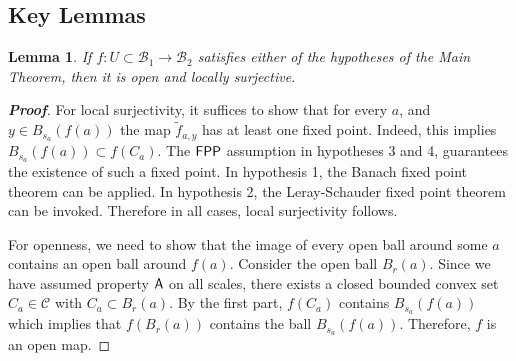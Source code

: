 \documentclass[a4, 12pt,leqno]{amsart}
\theoremstyle{plain}
\newtheorem{lemma}{Lemma}[section]
\theoremstyle{definition}
\theoremstyle{remark}
\numberwithin{equation}{section}
\newcommand{\B}{\mathcal{B}}
\begin{document}
\subsection{Key Lemmas}
\begin{lemma}\label{lemma:key-1}
	If $f: U \subset \B_1 \to \B_2$ satisfies either of the hypotheses of the Main Theorem, then it is open and locally surjective.
\end{lemma}
\begin{proof}[\footnotesize \textbf{Proof}]
For local surjectivity, it suffices to show that for every $a$, and $y\in B_{s_a}(f(a))$ the map $\tilde{f}_{a,y}$ has at least one fixed point. Indeed, this implies $B_{s_a}(f(a)) \subset f(C_a)$. The ${\sf FPP}$ assumption in hypotheses 3 and 4, guarantees the existence of such a fixed point. In hypothesis 1, the Banach fixed point theorem can be applied. In hypothesis 2, the Leray-Schauder fixed point theorem can be invoked. Therefore in all cases, local surjectivity follows. 
\par For openness, we need to show that the image of every open ball around some $a$ contains an open ball around $f(a)$. Consider the open ball $B_{r}(a)$. Since we have assumed property ${\sf A}$ on all scales, there exists a closed bounded convex set $C_a \in \mathscr{C}$ with $C_a \subset B_r(a)$. By the first part, $f(C_a)$ contains $B_{s_a}(f(a))$ which implies that $f(B_r(a))$ contains the ball $B_{s_{a}}(f(a))$. Therefore, $f$ is an open map. 
\end{proof}
\end{document}
